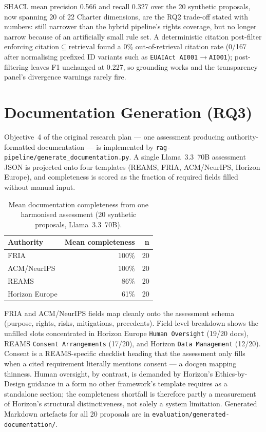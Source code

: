 SHACL mean precision 0.566 and recall 0.327 over the 20 synthetic proposals, now spanning 20 of 22 Charter dimensions, are the RQ2 trade-off stated with numbers: still narrower than the hybrid pipeline's rights coverage, but no longer narrow because of an artificially small rule set. A deterministic citation post-filter enforcing $\mathrm{citation}\subseteq\mathrm{retrieval}$ found a 0\% out-of-retrieval citation rate (0/167 after normalising prefixed ID variants such as \texttt{EUAIAct AI001}$\rightarrow$\texttt{AI001}); post-filtering leaves F1 unchanged at 0.227, so grounding works and the transparency panel's divergence warnings rarely fire.


\section{Documentation Generation (RQ3)}
\label{sec:docgen}

Objective~4 of the original research plan --- one assessment producing authority-formatted documentation --- is implemented by \texttt{rag-pipeline/generate\_documentation.py}. A single Llama~3.3~70B assessment JSON is projected onto four templates (REAMS, FRIA, ACM/NeurIPS, Horizon Europe), and completeness is scored as the fraction of required fields filled without manual input.

\begin{table}[htbp]
\centering
\caption{Mean documentation completeness from one harmonised assessment (20 synthetic proposals, Llama~3.3~70B).}
\label{tab:doc_completeness}
\begin{tabular}{lrr}
\toprule
\textbf{Authority} & \textbf{Mean completeness} & \textbf{n} \\
\midrule
FRIA & 100\% & 20 \\
ACM/NeurIPS & 100\% & 20 \\
REAMS & 86\% & 20 \\
Horizon Europe & 61\% & 20 \\
\bottomrule
\end{tabular}
\end{table}

FRIA and ACM/NeurIPS fields map cleanly onto the assessment schema (purpose, rights, risks, mitigations, precedents). Field-level breakdown shows the unfilled slots concentrated in Horizon Europe \texttt{Human Oversight} (19/20 docs), REAMS \texttt{Consent Arrangements} (17/20), and Horizon \texttt{Data Management} (12/20). Consent is a REAMS-specific checklist heading that the assessment only fills when a cited requirement literally mentions consent --- a docgen mapping thinness. Human oversight, by contrast, is demanded by Horizon's Ethics-by-Design guidance in a form no other framework's template requires as a standalone section; the completeness shortfall is therefore partly a measurement of Horizon's structural distinctiveness, not solely a system limitation. Generated Markdown artefacts for all 20 proposals are in \texttt{evaluation/generated-documentation/}.

